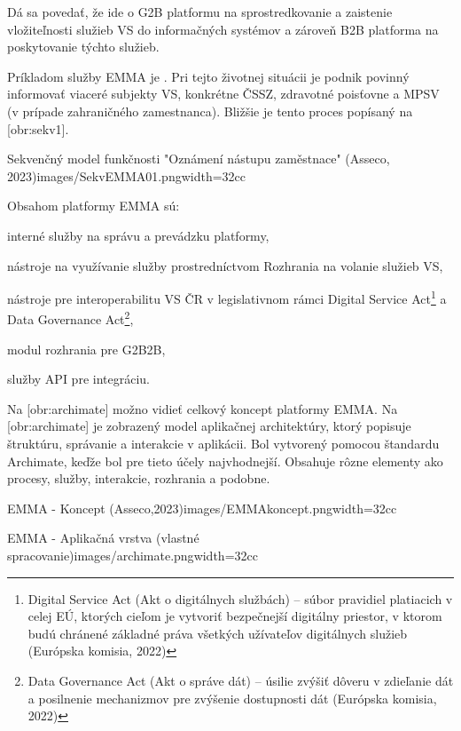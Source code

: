 Dá sa povedať, že ide o G2B platformu na sprostredkovanie a zaistenie vložiteľnosti služieb VS do informačných systémov a zároveň B2B platforma na poskytovanie týchto služieb.

Príkladom služby EMMA je . Pri tejto životnej situácii je podnik povinný informovať viaceré subjekty VS, konkrétne ČSSZ, zdravotné poisťovne a MPSV (v prípade zahraničného zamestnanca). Bližšie je tento proces popísaný na [obr:sekv1].

{Sekvenčný model funkčnosti "Oznámení nástupu zaměstnace" (Asseco, 2023)}{images/SekvEMMA01.png}{width=32cc}

Obsahom platformy EMMA sú:

\startitemize
\item{interné služby na správu a prevádzku platformy,}
\item{nástroje na využívanie služby prostredníctvom Rozhrania na volanie služieb VS,}
\item{nástroje pre interoperabilitu VS ČR v legislativnom rámci Digital Service Act\footnote{Digital Service Act (Akt o digitálnych službách) -- súbor pravidiel platiacich v celej EÚ, ktorých cieľom je vytvoriť bezpečnejší digitálny priestor, v ktorom budú chránené základné práva všetkých užívateľov digitálnych služieb \scr(Európska komisia, 2022)} a Data Governance Act\footnote{Data Governance Act (Akt o správe dát) -- úsilie zvýšiť dôveru v zdieľanie dát a posilnenie mechanizmov pre zvýšenie dostupnosti dát \scr(Európska komisia, 2022)},}
\item{modul rozhrania pre G2B2B,}
\item{služby API pre integráciu.}
\stopitemize 

Na [obr:archimate] možno vidieť celkový koncept platformy EMMA. Na [obr:archimate] je zobrazený model aplikačnej architektúry, ktorý popisuje štruktúru, správanie a interakcie v aplikácii. Bol vytvorený pomocou štandardu Archimate, keďže bol pre tieto účely najvhodnejší. Obsahuje rôzne elementy ako procesy, služby, interakcie, rozhrania a podobne.

{EMMA - Koncept (Asseco,2023)}{images/EMMAkoncept.png}{width=32cc}

{EMMA - Aplikačná vrstva (vlastné spracovanie)}{images/archimate.png}{width=32cc}


